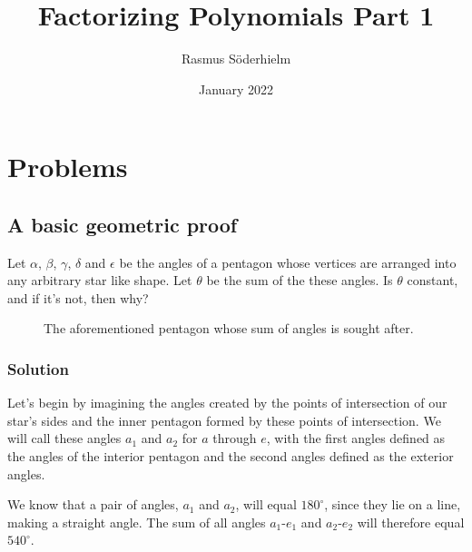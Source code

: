 \documentclass{article}
\title{Factorizing Polynomials Part 1}
\author{Rasmus Söderhielm}
\date{January 2022}
\newcommand{\solution}{\subsubsection*{\textcolor{MainColor}{Solution}}}
\theoremstyle{maintheorem}
\begin{document}
\linespread{1.5}\selectfont

\maketitle

\section*{\color{MainColor}Problems} \label{Problems}
\subsection{
    A basic geometric proof
}
Let $\alpha$, $\beta$, $\gamma$, $\delta$ and $\epsilon$ be the angles of a pentagon
whose vertices are arranged into any arbitrary star like shape.
Let $\theta$ be the sum of the these angles.
Is $\theta$ constant, and if it's not, then why?

\begin{figure}[h]\label{star}
    \centering

    \caption{The aforementioned pentagon whose sum of angles is sought after.}
\end{figure}

\solution

Let's begin by imagining the angles created by the points of intersection of our star's sides
and the inner pentagon formed by these points of intersection.
We will call these angles $a_1$ and $a_2$ for $a$ through $e$,
with the first angles defined as the angles of the interior pentagon and the second angles defined as the exterior angles.

We know that a pair of angles, $a_1$ and $a_2$, will equal $180^\circ$, since they lie on a line, making a straight angle.
The sum of all angles $a_1$-$e_1$ and $a_2$-$e_2$ will therefore equal $540^\circ$.
\end{document}

